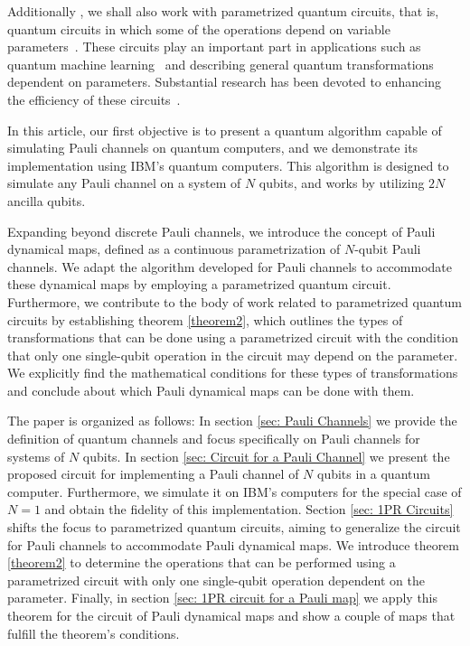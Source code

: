 \documentclass[10pt,letterpaper]{article} %
\begin{document}
Additionally , we shall also work with parametrized quantum circuits, that is,  
quantum circuits in which some of the operations depend on variable parameters~\cite{cerezo}. 
These circuits play an important 
part in applications such as quantum machine learning~\cite{Benedetti}
and describing general quantum transformations dependent on parameters. Substantial research has been 
devoted to enhancing the efficiency of these circuits~\cite{Watanabe,Rasmussen}. 

In this article, our first objective is to present a 
quantum algorithm capable of simulating Pauli channels on quantum computers, 
and we demonstrate its implementation using IBM's quantum computers. 
This algorithm is designed to simulate any Pauli channel on a system of $N$ qubits,
and works by utilizing $2N$ ancilla qubits.

Expanding beyond discrete Pauli channels,
we introduce the concept of Pauli dynamical maps, 
defined as a continuous parametrization of
$N$-qubit Pauli channels. 
We adapt the algorithm developed for Pauli channels 
to accommodate these dynamical maps by employing a 
parametrized quantum circuit. 
Furthermore, we contribute to the body of work related to parametrized quantum circuits by establishing theorem \ref{theorem2},
which outlines the types of transformations that 
can be done using a parametrized circuit with the condition that only one
 single-qubit operation in the circuit may depend on the parameter.
We explicitly find the mathematical conditions for these types of
transformations and conclude about which 
Pauli dynamical maps can be done with them. 

The paper is organized as follows: In section \ref{sec: Pauli Channels} 
we provide  the definition of quantum channels and focus specifically on Pauli channels for systems of
$N$ qubits. 
In section \ref{sec: Circuit for a Pauli Channel} we present  the proposed circuit 
for implementing a Pauli channel of $N$ qubits in a quantum computer. 
Furthermore, we simulate it on IBM’s computers for the special case of $N=1$
and obtain the fidelity of this implementation.  
Section \ref{sec: 1PR Circuits} shifts the focus to parametrized quantum circuits, 
aiming to generalize the circuit for Pauli channels to accommodate Pauli dynamical maps. 
We introduce theorem \ref{theorem2} to determine the operations that can be 
performed using a parametrized circuit 
with only one single-qubit operation dependent on the parameter.
Finally, in section \ref{sec: 1PR circuit for a Pauli map} 
we apply this theorem for the circuit of Pauli dynamical
maps and show a couple of maps that fulfill the theorem's conditions.
\end{document}
